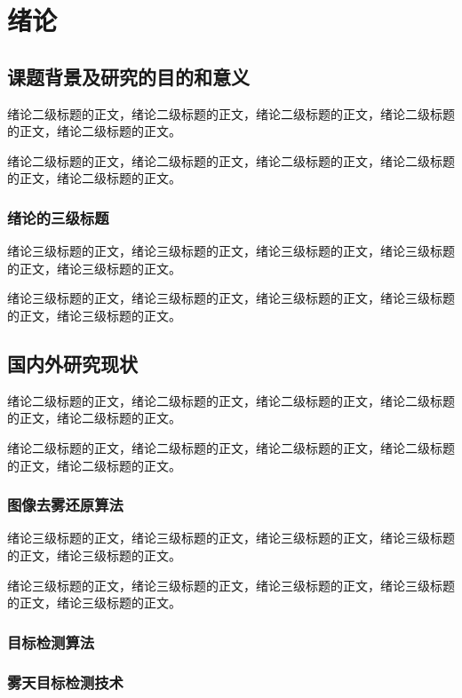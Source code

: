 \section{绪论\label{绪论}}


\subsection{课题背景及研究的目的和意义}

绪论二级标题的正文，绪论二级标题的正文，绪论二级标题的正文，绪论二级标题的正文，绪论二级标题的正文。

绪论二级标题的正文，绪论二级标题的正文，绪论二级标题的正文，绪论二级标题的正文，绪论二级标题的正文。

\subsubsection{绪论的三级标题}

绪论三级标题的正文，绪论三级标题的正文，绪论三级标题的正文，绪论三级标题的正文，绪论三级标题的正文。

绪论三级标题的正文，绪论三级标题的正文，绪论三级标题的正文，绪论三级标题的正文，绪论三级标题的正文。


\subsection{国内外研究现状}

绪论二级标题的正文，绪论二级标题的正文，绪论二级标题的正文，绪论二级标题的正文，绪论二级标题的正文。

绪论二级标题的正文，绪论二级标题的正文，绪论二级标题的正文，绪论二级标题的正文，绪论二级标题的正文。

\subsubsection{图像去雾还原算法}

绪论三级标题的正文，绪论三级标题的正文，绪论三级标题的正文，绪论三级标题的正文，绪论三级标题的正文。

绪论三级标题的正文，绪论三级标题的正文，绪论三级标题的正文，绪论三级标题的正文，绪论三级标题的正文。

\subsubsection{目标检测算法}


\subsubsection{雾天目标检测技术}


